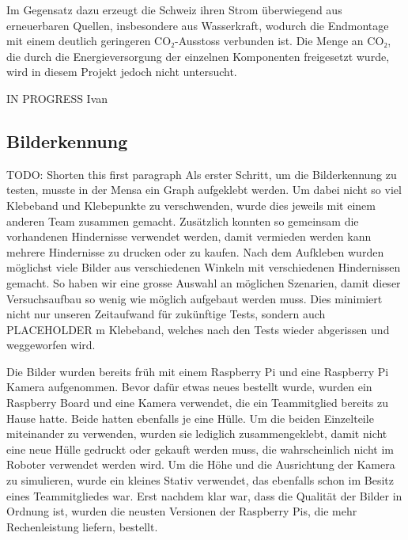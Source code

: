 Im Gegensatz dazu erzeugt die Schweiz ihren Strom überwiegend aus erneuerbaren Quellen, insbesondere aus Wasserkraft, wodurch die Endmontage mit einem deutlich geringeren CO₂-Ausstoss verbunden ist. Die Menge an CO₂, die durch die Energieversorgung der einzelnen Komponenten freigesetzt wurde, wird in diesem Projekt jedoch nicht untersucht.





IN PROGRESS
Ivan



\subsection{Bilderkennung}

TODO: Shorten this first paragraph
Als erster Schritt, um die Bilderkennung zu testen, musste in der Mensa ein Graph aufgeklebt werden.
Um dabei nicht so viel Klebeband und Klebepunkte zu verschwenden, wurde dies jeweils mit einem anderen Team zusammen gemacht. Zusätzlich konnten so gemeinsam die vorhandenen Hindernisse verwendet werden, damit vermieden werden kann mehrere Hindernisse zu drucken oder zu kaufen.
Nach dem Aufkleben wurden möglichst viele Bilder aus verschiedenen Winkeln mit verschiedenen Hindernissen gemacht. So haben wir eine grosse Auswahl an möglichen Szenarien, damit dieser Versuchsaufbau so wenig wie möglich aufgebaut werden muss. Dies minimiert nicht nur unseren Zeitaufwand für zukünftige Tests, sondern auch PLACEHOLDER m Klebeband, welches nach den Tests wieder abgerissen und weggeworfen wird.

Die Bilder wurden bereits früh mit einem Raspberry Pi und eine Raspberry Pi Kamera aufgenommen. Bevor dafür etwas neues bestellt wurde, wurden ein Raspberry Board und eine Kamera verwendet, die ein Teammitglied bereits zu Hause hatte. Beide hatten ebenfalls je eine Hülle.
Um die beiden Einzelteile miteinander zu verwenden, wurden sie lediglich zusammengeklebt, damit nicht eine neue Hülle gedruckt oder gekauft werden muss, die wahrscheinlich nicht im Roboter verwendet werden wird.
Um die Höhe und die Ausrichtung der Kamera zu simulieren, wurde ein kleines Stativ verwendet, das ebenfalls schon im Besitz eines Teammitgliedes war.
Erst nachdem klar war, dass die Qualität der Bilder in Ordnung ist, wurden die neusten Versionen der Raspberry Pis, die mehr Rechenleistung liefern, bestellt.


